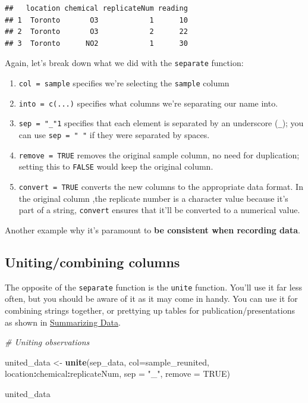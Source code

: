 \documentclass[
]{book}
\newenvironment{Shaded}{\begin{snugshade}}{\end{snugshade}}
\newcommand{\AttributeTok}[1]{\textcolor[rgb]{0.13,0.29,0.53}{#1}}
\newcommand{\CommentTok}[1]{\textcolor[rgb]{0.56,0.35,0.01}{\textit{#1}}}
\newcommand{\ConstantTok}[1]{\textcolor[rgb]{0.56,0.35,0.01}{#1}}
\newcommand{\FunctionTok}[1]{\textcolor[rgb]{0.13,0.29,0.53}{\textbf{#1}}}
\newcommand{\NormalTok}[1]{#1}
\newcommand{\OtherTok}[1]{\textcolor[rgb]{0.56,0.35,0.01}{#1}}
\newcommand{\SpecialCharTok}[1]{\textcolor[rgb]{0.81,0.36,0.00}{\textbf{#1}}}
\newcommand{\StringTok}[1]{\textcolor[rgb]{0.31,0.60,0.02}{#1}}
\providecommand{\tightlist}{%
  \setlength{\itemsep}{0pt}\setlength{\parskip}{0pt}}
\begin{document}
\begin{verbatim}
##   location chemical replicateNum reading
## 1  Toronto       O3            1      10
## 2  Toronto       O3            2      22
## 3  Toronto      NO2            1      30
\end{verbatim}

Again, let's break down what we did with the \texttt{separate} function:

\begin{enumerate}
\def\labelenumi{\arabic{enumi}.}
\tightlist
\item
  \texttt{col\ =\ sample} specifies we're selecting the \texttt{sample} column
\item
  \texttt{into\ =\ c(...)} specifies what columns we're separating our name into.
\item
  \texttt{sep\ =\ "\_"1} specifies that each element is separated by an underscore (\texttt{\_}); you can use \texttt{sep\ =\ "\ "} if they were separated by spaces.
\item
  \texttt{remove\ =\ TRUE} removes the original sample column, no need for duplication; setting this to \texttt{FALSE} would keep the original column.
\item
  \texttt{convert\ =\ TRUE} converts the new columns to the appropriate data format. In the original column ,the replicate number is a character value because it's part of a string, \texttt{convert} ensures that it'll be converted to a numerical value.
\end{enumerate}

Another example why it's paramount to \textbf{be consistent when recording data}.

\hypertarget{unitingcombining-columns}{%
\subsection{Uniting/combining columns}\label{unitingcombining-columns}}

The opposite of the \texttt{separate} function is the \texttt{unite} function. You'll use it far less often, but you should be aware of it as it may come in handy. You can use it for combining strings together, or prettying up tables for publication/presentations as shown in \protect\hyperlink{summarizing-data}{Summarizing Data}.

\begin{Shaded}
\begin{Highlighting}[]
\CommentTok{\# Uniting observations}

\NormalTok{united\_data }\OtherTok{\textless{}{-}} \FunctionTok{unite}\NormalTok{(sep\_data,}
                     \AttributeTok{col=}\NormalTok{sample\_reunited,}
\NormalTok{                     location}\SpecialCharTok{:}\NormalTok{chemical}\SpecialCharTok{:}\NormalTok{replicateNum, }
                     \AttributeTok{sep =} \StringTok{"\_"}\NormalTok{,}
                     \AttributeTok{remove =} \ConstantTok{TRUE}\NormalTok{)}

\NormalTok{united\_data}
\end{Highlighting}
\end{Shaded}
\end{document}
